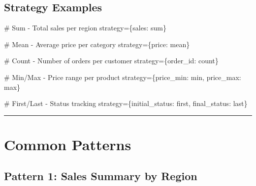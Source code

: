 \documentclass[
  letterpaper,
]{scrbook}
\newenvironment{Shaded}{\begin{snugshade}}{\end{snugshade}}
\newcommand{\CommentTok}[1]{\textcolor[rgb]{0.37,0.37,0.37}{#1}}
\newcommand{\NormalTok}[1]{\textcolor[rgb]{0.00,0.23,0.31}{#1}}
\newcommand{\OperatorTok}[1]{\textcolor[rgb]{0.37,0.37,0.37}{#1}}
\newcommand{\StringTok}[1]{\textcolor[rgb]{0.13,0.47,0.30}{#1}}
\begin{document}
\subsection{Strategy Examples}\label{strategy-examples}

\begin{Shaded}
\begin{Highlighting}[]
\CommentTok{\# Sum {-} Total sales per region}
\NormalTok{strategy}\OperatorTok{=}\NormalTok{\{}\StringTok{\textquotesingle{}sales\textquotesingle{}}\NormalTok{: }\StringTok{\textquotesingle{}sum\textquotesingle{}}\NormalTok{\}}

\CommentTok{\# Mean {-} Average price per category}
\NormalTok{strategy}\OperatorTok{=}\NormalTok{\{}\StringTok{\textquotesingle{}price\textquotesingle{}}\NormalTok{: }\StringTok{\textquotesingle{}mean\textquotesingle{}}\NormalTok{\}}

\CommentTok{\# Count {-} Number of orders per customer}
\NormalTok{strategy}\OperatorTok{=}\NormalTok{\{}\StringTok{\textquotesingle{}order\_id\textquotesingle{}}\NormalTok{: }\StringTok{\textquotesingle{}count\textquotesingle{}}\NormalTok{\}}

\CommentTok{\# Min/Max {-} Price range per product}
\NormalTok{strategy}\OperatorTok{=}\NormalTok{\{}\StringTok{\textquotesingle{}price\_min\textquotesingle{}}\NormalTok{: }\StringTok{\textquotesingle{}min\textquotesingle{}}\NormalTok{, }\StringTok{\textquotesingle{}price\_max\textquotesingle{}}\NormalTok{: }\StringTok{\textquotesingle{}max\textquotesingle{}}\NormalTok{\}}

\CommentTok{\# First/Last {-} Status tracking}
\NormalTok{strategy}\OperatorTok{=}\NormalTok{\{}\StringTok{\textquotesingle{}initial\_status\textquotesingle{}}\NormalTok{: }\StringTok{\textquotesingle{}first\textquotesingle{}}\NormalTok{, }\StringTok{\textquotesingle{}final\_status\textquotesingle{}}\NormalTok{: }\StringTok{\textquotesingle{}last\textquotesingle{}}\NormalTok{\}}
\end{Highlighting}
\end{Shaded}

\begin{center}\rule{0.5\linewidth}{0.5pt}\end{center}

\section{Common Patterns}\label{common-patterns-3}

\subsection{Pattern 1: Sales Summary by
Region}\label{pattern-1-sales-summary-by-region}
\end{document}
